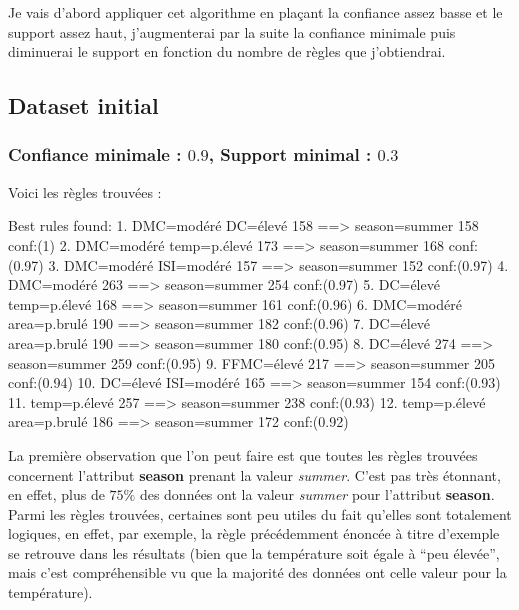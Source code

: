 \documentclass{article}
\begin{document}
\begin{sffamily}
Je vais d'abord appliquer cet algorithme en plaçant la confiance assez basse et le support assez haut, j'augmenterai par la suite
la confiance minimale puis diminuerai le support en fonction du nombre de règles que j'obtiendrai.

\subsection{Dataset initial}

\subsubsection*{Confiance minimale : $0.9$, Support minimal : $0.3$}

Voici les règles trouvées :

\begin{center}
	\begin{boxedverbatim}
Best rules found:
  1. DMC=modéré DC=élevé 158 ==> season=summer 158    conf:(1)
  2. DMC=modéré temp=p.élevé 173 ==> season=summer 168    conf:(0.97)
  3. DMC=modéré ISI=modéré 157 ==> season=summer 152    conf:(0.97)
  4. DMC=modéré 263 ==> season=summer 254    conf:(0.97)
  5. DC=élevé temp=p.élevé 168 ==> season=summer 161    conf:(0.96)
  6. DMC=modéré area=p.brulé 190 ==> season=summer 182    conf:(0.96)
  7. DC=élevé area=p.brulé 190 ==> season=summer 180    conf:(0.95)
  8. DC=élevé 274 ==> season=summer 259    conf:(0.95)
  9. FFMC=élevé 217 ==> season=summer 205    conf:(0.94)
 10. DC=élevé ISI=modéré 165 ==> season=summer 154    conf:(0.93)
 11. temp=p.élevé 257 ==> season=summer 238    conf:(0.93)
 12. temp=p.élevé area=p.brulé 186 ==> season=summer 172    conf:(0.92)	
	\end{boxedverbatim}
\end{center}

La première observation que l'on peut faire est que toutes les règles trouvées concernent l'attribut \textbf{season} prenant la 
valeur \textit{summer}. C'est pas très étonnant, en effet, plus de $75\%$ des données ont la valeur \textit{summer} pour 
l'attribut \textbf{season}. Parmi les règles trouvées, certaines sont peu utiles du fait qu'elles sont totalement logiques, en 
effet, par exemple, la règle précédemment énoncée à titre d'exemple se retrouve dans les résultats (bien que la température soit
égale à ``peu élevée'', mais c'est compréhensible vu que la majorité des données ont celle valeur pour la température). \\


\end{sffamily}
\end{document}
